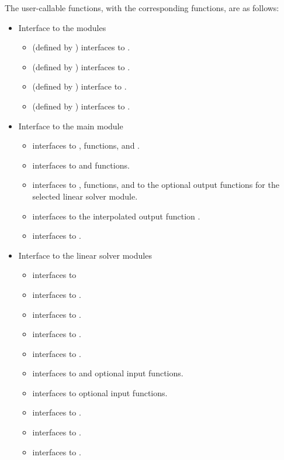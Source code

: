 The user-callable functions, with the corresponding {\cvode} functions,
are as follows:
\begin{itemize}
\item
  Interface to the {\nvector} modules
  \begin{itemize}
  \item {} (defined by {\nvecs}) 
    interfaces to .
  \item {} (defined by {\nvecp}) 
    interfaces to .
  \item {} (defined by {\nvecs})
    interface to .
  \item {}  (defined by {\nvecp})
    interfaces to .
  \end{itemize}
\item Interface to the main {\cvode} module
  \begin{itemize}
  \item {}
    interfaces to ,  functions, and .
  \item {}  
    interfaces to  and  functions.
  \item {}
    interfaces to ,  functions, and to the optional
    output functions for the selected linear solver module.
  \item {}     
    interfaces to the interpolated output function .
  \item {}    
    interfaces to .
  \end{itemize}  
\item Interface to the linear solver modules
  \begin{itemize}
  \item {}    
    interfaces to 
  \item {}
    interfaces to .
  \item {}
    interfaces to .
  \item {}
    interfaces to .
  \item {}
    interfaces to .
  \item {}
    interfaces to  and {\spgmr} optional input functions.
  \item {} 
    interfaces to {\spgmr} optional input functions.
  \item {}
   interfaces to .
 \item {}
   interfaces to .
 \item {}
   interfaces to .
 \end{itemize}

\end{itemize}

